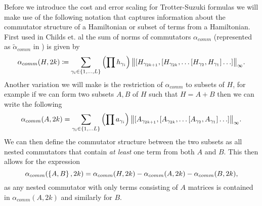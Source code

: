 Before we introduce the cost and error scaling for Trotter-Suzuki formulas we will make use of the following notation that captures information about the commutator structure of a Hamiltonian or subset of terms from a Hamiltonian. First used in Childs et. al \cite{childs2021theory} the sum of norms of commutators $\alpha_{comm}$ (represented as $\widetilde{\alpha}_{comm}$ in \cite{childs2021theory}) is given by
\begin{equation}
    \alpha_{comm}(H, 2k) \coloneqq \sum_{\gamma_i \in \left\{ 1,\ldots, L \right\}} \left( \prod h_{\gamma_i} \right) \norm{[H_{\gamma_{2k+1}}, [H_{\gamma_{2k}},\ldots[H_{\gamma_2}, H_{\gamma_1}]\ldots]}_{\infty}. \label{def:alpha_comm}
\end{equation}
Another variation we will make is the restriction of $\alpha_{comm}$ to subsets of $H$, for example if we can form two subsets $A, B$ of $H$ such that $H = A+ B$ then we can write the following
\begin{equation}
    \alpha_{comm}(A, 2k) = \sum_{\gamma_i \in \left\{ 1,\ldots L \right\}} \left( \prod a_{\gamma_i} \right) \norm{[A_{\gamma_{2k+1}}, [A_{\gamma_{2k}},\ldots[A_{\gamma_2}, A_{\gamma_1}]\ldots]}_{\infty}.
\end{equation}
We can then define the commutator structure between the two subsets as all nested commutators that contain \emph{at least} one term from both $A$ and $B$. This then allows for the expression
\begin{equation}
    \alpha_{comm}(\left\{ A,B \right\}, 2k) = \alpha_{comm}(H, 2k) - \alpha_{comm}(A, 2k) - \alpha_{comm}(B, 2k),
\end{equation}
as any nested commutator with only terms consisting of $A$  matrices is contained in $\alpha_{comm}(A, 2k)$ and similarly for $B$.

